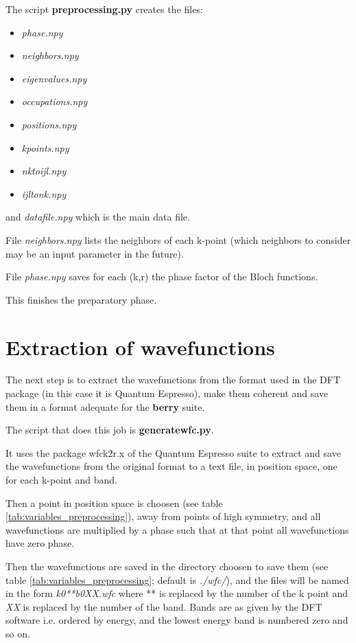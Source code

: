 \documentclass[a4paper,12pt]{report}
\begin{document}
\newpage
The script \textbf{preprocessing.py} creates the files:
\begin{itemize}
 \item \emph{phase.npy}
 \item \emph{neighbors.npy}
 \item \emph{eigenvalues.npy}
 \item \emph{occupations.npy}
 \item \emph{positions.npy}
 \item \emph{kpoints.npy}
 \item \emph{nktoijl.npy}
 \item \emph{ijltonk.npy}
\end{itemize}
and \emph{datafile.npy} which is the main data file.

File \emph{neighbors.npy} lists the neighbors of each k-point
(which neighbors to consider may be an input parameter in the future).

File \emph{phase.npy} saves for each (k,r) the phase factor of the Bloch functions.

This finishes the preparatory phase.

\section{Extraction of wavefunctions}

The next step is to extract the wavefunctions from the format used in the DFT package
(in this case it is {\sc Quantum Espresso}),
make them coherent and save them in a format adequate for the \textbf{berry} suite.

The script that does this job is \textbf{generatewfc.py}.

It uses the package wfck2r.x of the {\sc Quantum Espresso} suite to extract and save the wavefunctions
from the original format to a text file, in position space, one for each k-point and band.

Then a point in position space is choosen (see table \ref{tab:variables_preprocessing}),
away from points of high symmetry, and all wavefunctions
are multiplied by a phase such that at that point all wavefunctions have zero phase.

Then the wavefunctions are saved in the directory choosen to save them
(see table \ref{tab:variables_preprocessing}; default is \emph{./wfc/}),
and the files will be named in the form \emph{k0**b0XX.wfc} where ** is replaced by the number of the k point
and \emph{XX} is replaced by the number of the band.
Bands are as given by the DFT software i.e. ordered by energy, and the lowest energy band is numbered zero and so on.
\end{document}
